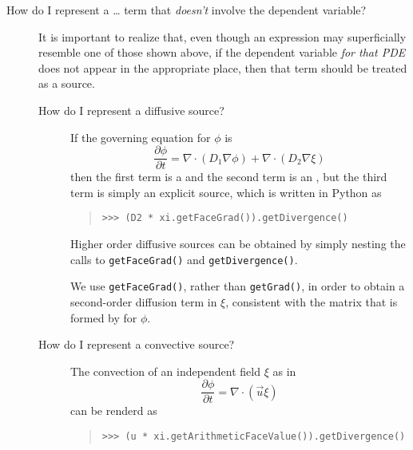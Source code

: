 \begin{description}
\begin{description}
            \item[How do I represent a \dots{} term that 
            \emph{doesn't} involve the dependent variable?]
            It is important to realize that, even though an expression may
            superficially resemble one of those shown above, if the
            dependent variable \emph{for that PDE} does not appear in the
            appropriate place, then that term should be treated as a source.
            \begin{description}
                \item[How do I represent a diffusive source?]
                    If the governing equation for $\phi$ is
                    \[
                        \frac{\partial \phi}{\partial t} 
                        = \nabla\cdot\left( D_1 \nabla \phi\right)
                        + \nabla\cdot\left( D_2 \nabla \xi\right)
                    \]
                    then the first term is a  and the second term 
                    is an , but the third term is 
                    simply an explicit source, which is written in Python as
                    \begin{quote}
\begin{verbatim}
>>> (D2 * xi.getFaceGrad()).getDivergence()
\end{verbatim}
                    \end{quote}
                    Higher order diffusive sources can be obtained by
                    simply nesting the calls to \verb+getFaceGrad()+
                    and \verb+getDivergence()+.
                    \begin{reSTadmonition}[Note]
                        We use \verb|getFaceGrad()|, rather than
                        \verb|getGrad()|, in order to obtain a
                        second-order diffusion term in $\xi$, consistent
                        with the matrix that is formed by
                         for $\phi$.
                    \end{reSTadmonition}

                \item[How do I represent a convective source?]
                    The convection of an independent field $\xi$ as in
                    \[
                        \frac{\partial \phi}{\partial t} 
                        = \nabla\cdot
                        \left(
                            \vec{u} \xi
                        \right)
                    \]
                    can be renderd as
                    \begin{quote}
\begin{verbatim}
>>> (u * xi.getArithmeticFaceValue()).getDivergence()
\end{verbatim}
                    \end{quote}


\end{description}
\end{description}
\end{description}
